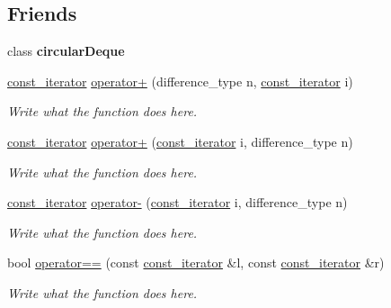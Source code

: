 \subsection*{Friends}
\begin{DoxyCompactItemize}
\item 
\hypertarget{classcircularDeque_1_1const__iterator_aa63d8b47e75b076d05ec6aa14e29109b}{class {\bfseries circular\+Deque}}\label{classcircularDeque_1_1const__iterator_aa63d8b47e75b076d05ec6aa14e29109b}

\item 
\hyperlink{classcircularDeque_1_1const__iterator}{const\+\_\+iterator} \hyperlink{classcircularDeque_1_1const__iterator_a691016b314e13f42d0bb408060c49057}{operator+} (difference\+\_\+type n, \hyperlink{classcircularDeque_1_1const__iterator}{const\+\_\+iterator} i)
\begin{DoxyCompactList}\small\item\em Write what the function does here. \end{DoxyCompactList}\item 
\hyperlink{classcircularDeque_1_1const__iterator}{const\+\_\+iterator} \hyperlink{classcircularDeque_1_1const__iterator_a1ce501f5fc02fd634576dddb7afdc09a}{operator+} (\hyperlink{classcircularDeque_1_1const__iterator}{const\+\_\+iterator} i, difference\+\_\+type n)
\begin{DoxyCompactList}\small\item\em Write what the function does here. \end{DoxyCompactList}\item 
\hyperlink{classcircularDeque_1_1const__iterator}{const\+\_\+iterator} \hyperlink{classcircularDeque_1_1const__iterator_a39577c462b0d4115f031e1bdfb7b19b5}{operator-\/} (\hyperlink{classcircularDeque_1_1const__iterator}{const\+\_\+iterator} i, difference\+\_\+type n)
\begin{DoxyCompactList}\small\item\em Write what the function does here. \end{DoxyCompactList}\item 
bool \hyperlink{classcircularDeque_1_1const__iterator_ac7550bfcb9c7fd7ce95bb5d0d45bb076}{operator==} (const \hyperlink{classcircularDeque_1_1const__iterator}{const\+\_\+iterator} \&l, const \hyperlink{classcircularDeque_1_1const__iterator}{const\+\_\+iterator} \&r)
\begin{DoxyCompactList}\small\item\em Write what the function does here. \end{DoxyCompactList}\item 

\end{DoxyCompactItemize}
